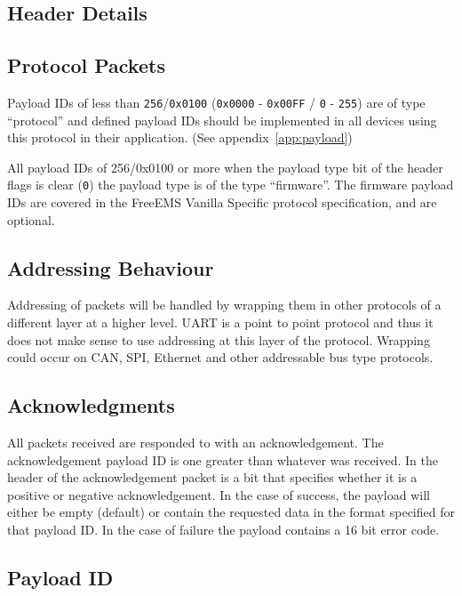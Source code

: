 \documentclass[12pt,a4paper,titlepage]{article}
\begin{document}
\begin{titlepage}
\begin{center}
\section{Header Details}

\subsection{Protocol Packets}

Payload IDs of less than \texttt{256}/\texttt{0x0100} (\texttt{0x0000} -
\texttt{0x00FF} / \texttt{0} - \texttt{255}) are of type ``protocol'' and
defined payload IDs should be implemented in all devices using this protocol in
their application. (See appendix~\ref{app:payload})

All payload IDs of 256/0x0100 or more when the payload type bit of the header
flags is clear (\texttt{0}) the payload type is of the type ``firmware''. The firmware
payload IDs are covered in the FreeEMS Vanilla Specific protocol specification,
and are optional.

\subsection{Addressing Behaviour}

Addressing of packets will be handled by wrapping them in other protocols of
a different layer at a higher level. UART is a point to point protocol and
thus it does not make sense to use addressing at this layer of the protocol.
Wrapping could occur on CAN, SPI, Ethernet and other addressable bus type
protocols.

\subsection{Acknowledgments}

All packets received are responded to with an acknowledgement. The
acknowledgement payload ID is one greater than whatever was received. In the
header of the acknowledgement packet is a bit that specifies whether it is a
positive or negative acknowledgement. In the case of success, the payload will
either be empty (default) or contain the requested data in the format specified
for that payload ID. In the case of failure the payload contains a 16 bit error
code.

\subsection{Payload ID}


\end{center}
\end{titlepage}
\end{document}
